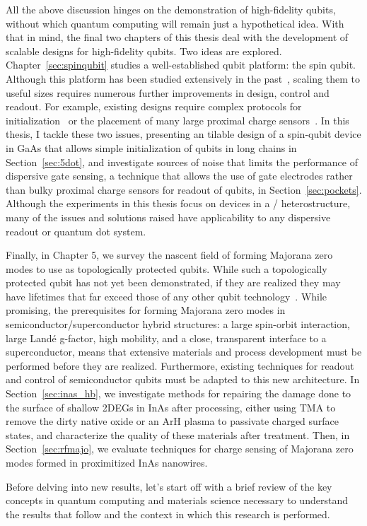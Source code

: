 All the above discussion hinges on the demonstration of high-fidelity qubits, without which quantum computing will remain just
a hypothetical idea. With that in mind, the final two chapters of this thesis deal with the development of scalable
designs for high-fidelity qubits. Two ideas are explored. Chapter~\ref{sec:spinqubit} studies a well-established qubit platform: the spin
qubit. Although this platform has been studied extensively in the past~\cite{RevModPhys.75.1,RevModPhys.79.1217}, scaling
them to useful sizes requires numerous further improvements in design, control and readout. For example, existing designs
require complex protocols for initialization~\cite{PhysRevApplied.6.054013} or the placement of many large proximal charge
sensors~\cite{s41467-019-09194-x}. In this thesis, I tackle these two issues, presenting an tilable design of a spin-qubit
device in GaAs that allows simple initialization of qubits in long chains in Section~\ref{sec:5dot}, and investigate sources
of noise that limits the performance of dispersive gate sensing, a technique that allows the use of gate electrodes rather
than bulky proximal charge sensors for readout of qubits, in Section~\ref{sec:pockets}. Although the experiments in this thesis
focus on devices in a / heterostructure, many of the issues and solutions raised have applicability to any
dispersive readout or quantum dot system.

Finally, in Chapter 5, we survey the nascent field of forming Majorana zero modes to use as topologically protected qubits. While
such a topologically protected qubit has not yet been demonstrated, if they are realized they may have lifetimes that far exceed those of
any other qubit technology~\cite{s41578-018-0003-1}. While promising, the prerequisites for forming Majorana zero modes in semiconductor/superconductor
hybrid structures: a large spin-orbit interaction, large Land\'e g-factor, high mobility, and a close, transparent interface to a superconductor, means that
extensive materials and process development must be performed before they are realized. Furthermore, existing techniques for readout and control of semiconductor
qubits must be adapted to this new architecture. In Section~\ref{sec:inas_hb}, we investigate methods for repairing the damage done to the surface of shallow
2DEGs in InAs after processing, either using TMA to remove the dirty native oxide or an ArH plasma to passivate charged surface states, and characterize
the quality of these materials after treatment. Then, in Section~\ref{sec:rfmajo}, we evaluate techniques for charge sensing of Majorana zero modes formed
in proximitized InAs nanowires.

Before delving into new results, let's start off with a brief review of the key concepts in quantum computing and materials science necessary
to understand the results that follow and the context in which this research is performed.